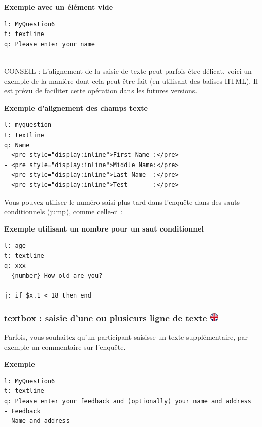 \documentclass[
]{book}
\begin{document}
\textbf{Exemple avec un élément vide}

\begin{verbatim}
l: MyQuestion6
t: textline
q: Please enter your name
-
\end{verbatim}

CONSEIL : L'alignement de la saisie de texte peut parfois être délicat,
voici un exemple de la manière dont cela peut être fait (en utilisant
des balises HTML). Il est prévu de faciliter cette opération dans les
futures versions.

\textbf{Exemple d'alignement des champs texte}

\begin{verbatim}
l: myquestion
t: textline
q: Name
- <pre style="display:inline">First Name :</pre>
- <pre style="display:inline">Middle Name:</pre>
- <pre style="display:inline">Last Name  :</pre>
- <pre style="display:inline">Test       :</pre>
\end{verbatim}

Vous pouvez utiliser le numéro saisi plus tard dans l'enquête dans des
sauts conditionnels (jump), comme celle-ci :

\textbf{Exemple utilisant un nombre pour un saut conditionnel}

\begin{verbatim}
l: age
t: textline
q: xxx
- {number} How old are you?

j: if $x.1 < 18 then end
\end{verbatim}

\hypertarget{textbox-saisie-dune-ou-plusieurs-ligne-de-texte}{%
\subsubsection[textbox : saisie d'une ou plusieurs ligne de texte
]{\texorpdfstring{textbox : saisie d'une ou plusieurs ligne de texte
\href{https://www.psytoolkit.org/doc3.2.0/online-survey-syntax.html\#textbox}{\protect\includegraphics{img/ukflag.png}}}{textbox : saisie d'une ou plusieurs ligne de texte }}\label{textbox-saisie-dune-ou-plusieurs-ligne-de-texte}}

Parfois, vous souhaitez qu'un participant saisisse un texte
supplémentaire, par exemple un commentaire sur l'enquête.

\textbf{Exemple}

\begin{verbatim}
l: MyQuestion6
t: textline
q: Please enter your feedback and (optionally) your name and address
- Feedback
- Name and address
\end{verbatim}
\end{document}
